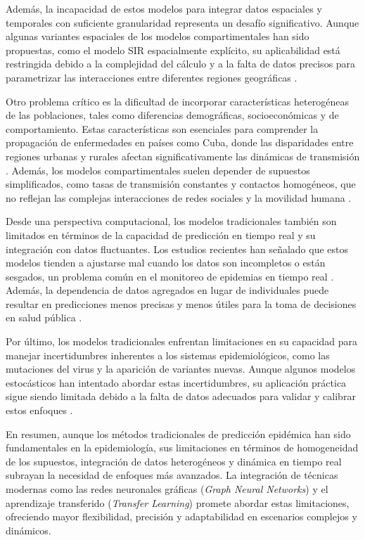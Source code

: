Además, la incapacidad de estos modelos para integrar datos espaciales y temporales con suficiente granularidad representa un desafío significativo. Aunque algunas variantes espaciales de los modelos compartimentales han sido propuestas, como el modelo SIR espacialmente explícito, su aplicabilidad está restringida debido a la complejidad del cálculo y a la falta de datos precisos para parametrizar las interacciones entre diferentes regiones geográficas \cite{MachineLearningReview2023}.

Otro problema crítico es la dificultad de incorporar características heterogéneas de las poblaciones, tales como diferencias demográficas, socioeconómicas y de comportamiento. Estas características son esenciales para comprender la propagación de enfermedades en países como Cuba, donde las disparidades entre regiones urbanas y rurales afectan significativamente las dinámicas de transmisión \cite{Nguyen2023, Panagopoulos2021}. Además, los modelos compartimentales suelen depender de supuestos simplificados, como tasas de transmisión constantes y contactos homogéneos, que no reflejan las complejas interacciones de redes sociales y la movilidad humana \cite{Nguyen2023}.

Desde una perspectiva computacional, los modelos tradicionales también son limitados en términos de la capacidad de predicción en tiempo real y su integración con datos fluctuantes. Los estudios recientes han señalado que estos modelos tienden a ajustarse mal cuando los datos son incompletos o están sesgados, un problema común en el monitoreo de epidemias en tiempo real \cite{Rizzo2020, Baccega2024}. Además, la dependencia de datos agregados en lugar de individuales puede resultar en predicciones menos precisas y menos útiles para la toma de decisiones en salud pública \cite{Santangelo2023}.

Por último, los modelos tradicionales enfrentan limitaciones en su capacidad para manejar incertidumbres inherentes a los sistemas epidemiológicos, como las mutaciones del virus y la aparición de variantes nuevas. Aunque algunos modelos estocásticos han intentado abordar estas incertidumbres, su aplicación práctica sigue siendo limitada debido a la falta de datos adecuados para validar y calibrar estos enfoques \cite{AutoSEIR2020}.

En resumen, aunque los métodos tradicionales de predicción epidémica han sido fundamentales en la epidemiología, sus limitaciones en términos de homogeneidad de los supuestos, integración de datos heterogéneos y dinámica en tiempo real subrayan la necesidad de enfoques más avanzados. La integración de técnicas modernas como las redes neuronales gráficas (\textit{Graph Neural Networks}) y el aprendizaje transferido (\textit{Transfer Learning}) promete abordar estas limitaciones, ofreciendo mayor flexibilidad, precisión y adaptabilidad en escenarios complejos y dinámicos.


